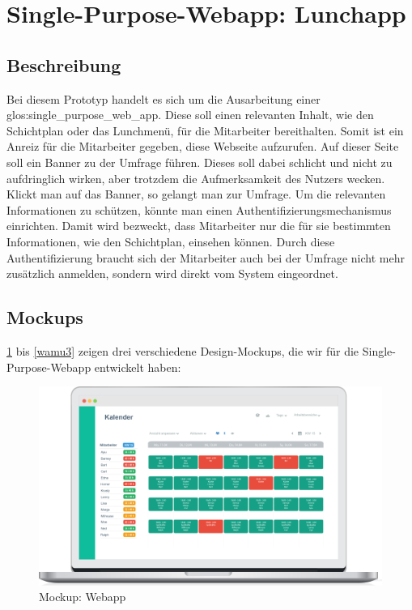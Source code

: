 \section{Single-Purpose-Webapp: Lunchapp}
\label{section:lunchapp}

\subsection{Beschreibung}


Bei diesem Prototyp handelt es sich um die Ausarbeitung einer \gls{glos:single_purpose_web_app}. Diese soll einen relevanten Inhalt, wie den Schichtplan oder das Lunchmenü, für die Mitarbeiter bereithalten. Somit ist ein Anreiz für die Mitarbeiter gegeben, diese Webseite aufzurufen. Auf dieser Seite soll ein Banner zu der Umfrage führen. Dieses soll dabei schlicht und nicht zu aufdringlich wirken, aber trotzdem die Aufmerksamkeit des Nutzers wecken. Klickt man auf das Banner, so gelangt man zur Umfrage. Um die relevanten Informationen zu schützen, könnte man einen Authentifizierungsmechanismus einrichten. Damit wird bezweckt, dass Mitarbeiter nur die für sie bestimmten Informationen, wie den Schichtplan, einsehen können. Durch diese Authentifizierung braucht sich der Mitarbeiter auch bei der Umfrage nicht mehr zusätzlich anmelden, sondern wird direkt vom System eingeordnet.

\subsection{Mockups}

\ref{wamu1} bis \ref{wamu3} zeigen drei verschiedene Design-Mockups, die wir für die Single-Purpose-Webapp entwickelt haben:

\begin{figure}[H] 
\centering 
\includegraphics[scale=0.72]{images/lunchapp_mockups/mockup1} 
\caption[Mockup: Webapp]{Mockup: Webapp} 
\label{wamu1} 
\end{figure}

